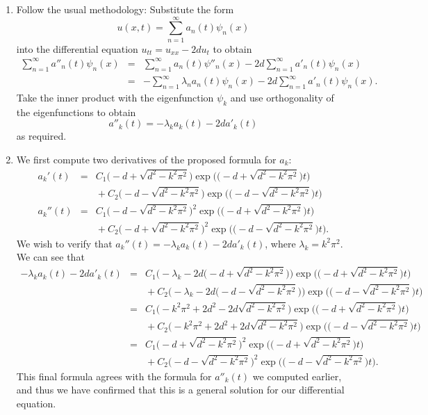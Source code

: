 \begin{solution}
\begin{enumerate}
\item Follow the usual methodology:  Substitute the form
\[ u(x,t) = \sum_{n=1}^\infty a_n(t) \psi_n(x)\]
into the differential equation $u_{tt} = u_{xx} - 2d u_t$ to obtain
\begin{eqnarray*}
   \sum_{n=1}^\infty a''_n(t) \psi_n(x)
    &=& \sum_{n=1}^\infty a_n(t) \psi''_n(x)
    - 2 d \sum_{n=1}^\infty a'_n(t) \psi_n(x) \\[0.5em]
    &=& -\sum_{n=1}^\infty \lambda_n a_n(t) \psi_n(x)
    - 2 d \sum_{n=1}^\infty a'_n(t) \psi_n(x).
\end{eqnarray*}
Take the inner product with the eigenfunction $\psi_k$
and use orthogonality of the eigenfunctions to obtain
\[ a''_k(t) = -\lambda_k a_k(t) -2 d a'_k(t)\]
as required.
\item We first compute two derivatives of the proposed formula for $a_k$:
\begin{eqnarray*}
a_k'(t) &=& C_1 \big(-d + \sqrt{d^2 -k^2\pi^2}\big) 
                 \exp\!\big(\big(-\!d+\sqrt{d^2-k^2\pi^2}\big)t\big) \\[0.25em]
        & & {}+C_2 \big(-d - \sqrt{d^2 -k^2\pi^2}\big)
                 \exp\!\big(\big(-\!d-\sqrt{d^2-k^2\pi^2}\big)t\big) \\[1em]
a_k''(t) &=& C_1 \big(-d - \sqrt{d^2 -k^2\pi^2}\big)^2 
                 \exp\!\big(\big(-\!d+\sqrt{d^2-k^2\pi^2}\big)t\big) \\[0.25em]
        & & {}+C_2 \big(-d + \sqrt{d^2 -k^2\pi^2}\big)^2
                 \exp\!\big(\big(-\!d-\sqrt{d^2-k^2\pi^2}\big)t\big).
\end{eqnarray*}
We wish to verify that $a_k''(t) = -\lambda_k a_k(t) - 2d a'_k(t)$,
where $\lambda_k = k^2\pi^2$.  We can see that
\begin{eqnarray*}
   -\lambda_k a_k(t) - 2d a'_k(t)
     &=& C_1\Big(-\lambda_k - 2d \big(-d + \sqrt{d^2 -k^2\pi^2}\big)\Big)
                \exp\!\big(\big(-\!d+\sqrt{d^2-k^2\pi^2}\big)t\big) \\[0.25em]
     &&{}+ C_2\Big(-\lambda_k - 2d \big(-d - \sqrt{d^2 -k^2\pi^2}\big)\Big)
                \exp\!\big(\big(-\!d-\sqrt{d^2-k^2\pi^2}\big)t\big) \\[1em]
     &=& C_1\big(-k^2\pi^2 + 2d^2 - 2d \sqrt{d^2 -k^2\pi^2}\big)
                \exp\!\big(\big(-\!d+\sqrt{d^2-k^2\pi^2}\big)t\big) \\[0.25em]
     &&{}+ C_2\big(-k^2\pi^2 + 2d^2 + 2d \sqrt{d^2 -k^2\pi^2}\big)
                \exp\!\big(\big(-\!d-\sqrt{d^2-k^2\pi^2}\big)t\big) \\[1em]
     &=& C_1\big(-d+\sqrt{d^2 -k^2\pi^2}\big)^2
                \exp\!\big(\big(-\!d+\sqrt{d^2-k^2\pi^2}\big)t\big) \\[0.25em]
     &&{}+ C_2\big(-d-\sqrt{d^2 -k^2\pi^2}\big)^2
                \exp\!\big(\big(-\!d-\sqrt{d^2-k^2\pi^2}\big)t\big).
\end{eqnarray*} 
This final formula agrees with the formula for $a''_k(t)$ we computed earlier,
and thus we have confirmed that this is a general solution for our differential equation.


\end{enumerate}
\end{solution}
